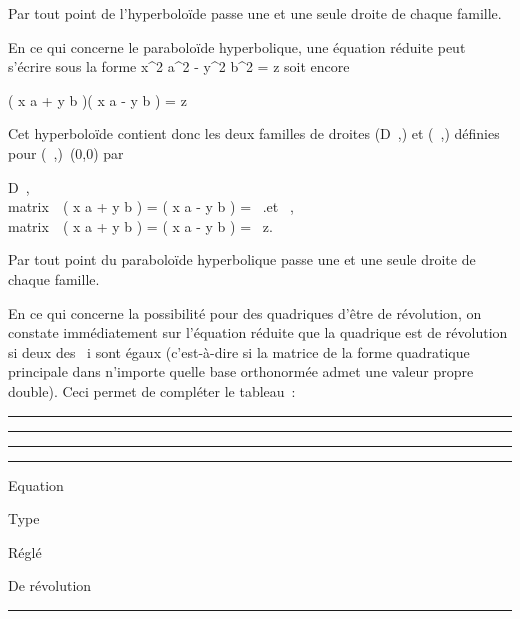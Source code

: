 Par tout point de l'hyperboloïde passe une et une seule droite de chaque
famille.

En ce qui concerne le paraboloïde hyperbolique, une équation réduite
peut s'écrire sous la forme  x^2 \over
a^2 - y^2 \over
b^2 = z soit encore

\left ( x \over a + y
\over b \right )\left (
x \over a - y \over b
\right ) = z

Cet hyperboloïde contient donc les deux familles de droites
(D\lambda~,\mu) et (\Delta\lambda~,\mu) définies pour
(\lambda~,\mu)\neq~(0,0) par

D\lambda~,\mu \left
\\matrix\,\lambda~\left
( x \over a + y \over b
\right ) = \muz \cr \cr
\mu\left ( x \over a - y
\over b \right ) =
\lambda~\right .\quad \text et
\quad \Delta\lambda~,\mu \left
\\matrix\,\lambda~\left
( x \over a + y \over b
\right ) = \mu \cr \cr
\mu\left ( x \over a - y
\over b \right ) =
\lambda~z\right .

Par tout point du paraboloïde hyperbolique passe une et une seule droite
de chaque famille.

En ce qui concerne la possibilité pour des quadriques d'être de
révolution, on constate immédiatement sur l'équation réduite que la
quadrique est de révolution si deux des \lambda~i sont égaux
(c'est-à-dire si la matrice de la forme quadratique principale \Phi dans
n'importe quelle base orthonormée admet une valeur propre double). Ceci
permet de compléter le tableau~:

\begin{center}\rule{3in}{0.4pt}\end{center}

\begin{center}\rule{3in}{0.4pt}\end{center}

\begin{center}\rule{3in}{0.4pt}\end{center}

\begin{center}\rule{3in}{0.4pt}\end{center}

Equation

Type

Réglé

De révolution

\begin{center}\rule{3in}{0.4pt}\end{center}

